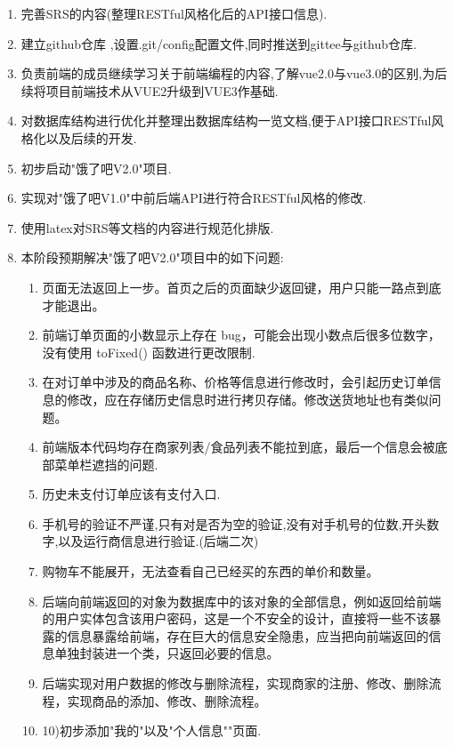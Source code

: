     \begin{enumerate}
 \item  完善SRS的内容(整理RESTful风格化后的API接口信息).
 \item  建立github仓库 ,设置.git/config配置文件,同时推送到gittee与github仓库.
 \item  负责前端的成员继续学习关于前端编程的内容,了解vue2.0与vue3.0的区别,为后续将项目前端技术从VUE2升级到VUE3作基础.
 \item  对数据库结构进行优化并整理出数据库结构一览文档,便于API接口RESTful风格化以及后续的开发.
 \item  初步启动"饿了吧V2.0"项目.
 \item  实现对"饿了吧V1.0"中前后端API进行符合RESTful风格的修改.
 \item  使用latex对SRS等文档的内容进行规范化排版.
 \item  本阶段预期解决"饿了吧V2.0"项目中的如下问题:
    \begin{enumerate}
        \item   页面无法返回上一步。首页之后的页面缺少返回键，用户只能一路点到底才能退出。
        \item   前端订单页面的小数显示上存在 bug，可能会出现小数点后很多位数字，没有使用 toFixed() 函数进行更改限制.
        \item   在对订单中涉及的商品名称、价格等信息进行修改时，会引起历史订单信息的修改，应在存储历史信息时进行拷贝存储。修改送货地址也有类似问题。
        \item   前端版本代码均存在商家列表/⻝品列表不能拉到底，最后⼀个信息会被底部菜单栏遮挡的问题.
        \item   历史未支付订单应该有支付入口.
        \item   手机号的验证不严谨,只有对是否为空的验证,没有对手机号的位数,开头数字,以及运行商信息进行验证.(后端二次)
        \item  购物车不能展开，无法查看自己已经买的东西的单价和数量。
        \item  后端向前端返回的对象为数据库中的该对象的全部信息，例如返回给前端的⽤户实体包含该⽤户密码，这是⼀个不安全的设计，直接将⼀些不该暴露的信息暴露给前端，存在巨⼤的信息安全隐患，应当把向前端返回的信息单独封装进⼀个类，只返回必要的信息。
        \item  后端实现对用户数据的修改与删除流程，实现商家的注册、修改、删除流程，实现商品的添加、修改、删除流程。
        \item  10)初步添加"我的"以及"个人信息""页面.
    \end{enumerate}
    \end{enumerate}
